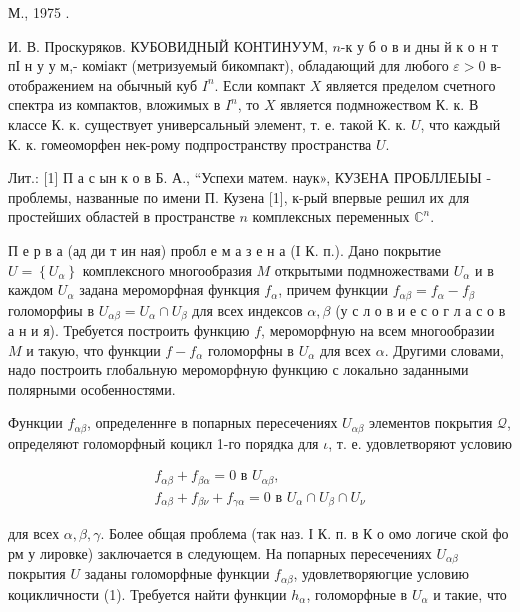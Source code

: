 \documentclass[10pt]{article}
\begin{document}
М., 1975 .

И. В. Проскуряков. КУБОВИДНЫЙ КОНТИНУУМ, $n$-к у б о в и дны й к о н т пІ н у у м,- коміакт (метризуемый бикомпакт), обладающий для любого $\varepsilon>0$ в-отображением на обычный куб $I^{n}$. Если компакт $X$ является пределом счетного спектра из компактов, вложимых в $I^{n}$, то $X$ является подмножеством К. к. В классе К. к. существует универсальный элемент, т. е. такой К. к. $U$, что каждый К. к. гомеоморфен нек-рому подпространству пространства $U$.



Лит.: [1] П а с ын к о в Б. А., “Успехи матем. наук», КУЗЕНА ПРОБЛЛЕЫЫ - проблемы, названные по имени П. Кузена [1], к-рый впервые решил их для простейших областей в пространстве $n$ комплексных переменных $\mathbb{C}^{n}$.



П е р в а (ад ди т ин ная) пробл е м а з е н а (I К. п.). Дано покрытие $U=\left\{U_{\alpha}\right\}$ комплексного многообразия $M$ открытыми подмножествами $U_{\alpha}$ и в каждом $U_{\alpha}$ задана мероморфная функция $f_{\alpha}$, причем функции $f_{\alpha \beta}=f_{\alpha}-f_{\beta}$ голоморфиы в $U_{\alpha \beta}=U_{\alpha} \cap U_{\beta}$ для всех индексов $\alpha, \beta$ (у с л о в и е с о г л а с о в а н и я). Требуется построить функцию $f$, мероморфную на всем многообразии $M$ и такую, что функции $f-f_{\alpha}$ голоморфны в $U_{\alpha}$ для всех $\alpha$. Другими словами, надо построить глобальную мероморфную функцию с локально заданными полярными особенностями.



Функции $f_{\alpha \beta}$, определеннғе в попарных пересечениях $U_{\alpha \beta}$ элементов покрытия $\mathcal{Q}$, определяют голоморфный коцикл 1-го порядка для $\iota$, т. е. удовлетворяют условию



\[

\begin{gathered}

f_{\alpha \beta}+f_{\beta \alpha}=0 \text { в } U_{\alpha \beta}, \\

f_{\alpha \beta}+f_{\beta \nu}+f_{\gamma \alpha}=0 \text { в } U_{\alpha} \cap U_{\beta} \cap U_{\nu}

\end{gathered}

\]



для всех $\alpha, \beta, \gamma$. Более общая проблема (так наз. І К. п. в К о омо логиче ской фо рм у лировке) заключается в следующем. На попарных пересечениях $U_{\alpha \beta}$ покрытия $U$ заданы голоморфные функции $f_{\alpha \beta}$, удовлетворяюгцие условию коцикличности (1). Требуется найти функции $h_{\alpha}$, голоморфные в $U_{\alpha}$ и такие, что
\end{document}
